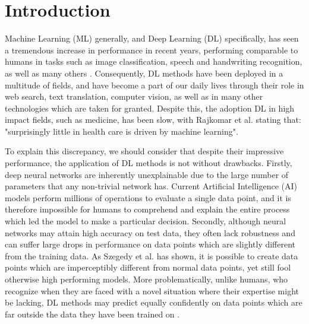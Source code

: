 \documentclass[runningheads]{llncs}
\begin{document}
\section{Introduction}
\label{sec:intro}

Machine Learning (ML) generally, and Deep Learning (DL) specifically, has seen a tremendous increase in performance in recent years, performing comparable to humans in tasks such as image classification, speech and handwriting recognition, as well as many others \cite{performance}. Consequently, DL methods have been deployed in a multitude of fields, and have become a part of our daily lives through their role in web search, text translation, computer vision, as well as in many other technologies which are taken for granted. Despite this, the adoption DL in high impact fields, such as medicine, has been slow, with Rajkomar et al. \cite{dlmed} stating that: "surprisingly little in health care is driven by machine learning".

To explain this discrepancy, we should consider that despite their impressive performance, the application of DL methods is not without drawbacks. Firstly, deep neural networks are inherently unexplainable due to the large number of parameters that any non-trivial network has. Current Artificial Intelligence (AI) models perform millions of operations to evaluate a single data point, and it is therefore impossible for humans to comprehend and explain the entire process which led the model to make a particular decision. Secondly, although neural networks may attain high accuracy on test data, they often lack robustness and can suffer large drops in performance on data points which are slightly different from the training data. As Szegedy et al. \cite{intriguing} has shown, it is possible to create data points which are imperceptibly different from normal data points, yet still fool otherwise high performing models. More problematically, unlike humans, who recognize when they are faced with a novel situation where their expertise might be lacking, DL methods may predict equally confidently on data points which are far outside the data they have been trained on \cite{tingsim}.
\end{document}
